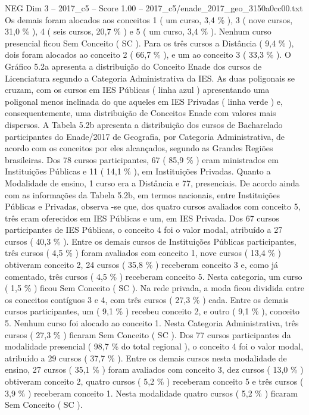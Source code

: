 \begin{textsample}{NEG Dim 3 – 2017\_c5 – Score 1.00 – 2017\_c5/enade\_2017\_geo\_3150a0cc00.txt}
Os demais foram alocados aos conceitos 1 ( um curso, 3,4 \% ), 3 ( nove cursos, 31,0 \% ), 4 ( seis cursos, 20,7 \% ) e 5 ( um curso, 3,4 \% ).
Nenhum curso presencial ficou Sem Conceito ( SC ).
Para os três cursos a Distância ( 9,4 \% ), dois foram alocados ao conceito 2 ( 66,7 \% ), e um ao conceito 3 ( 33,3 \% ).
O Gráfico 5.2a apresenta a distribuição do Conceito Enade dos cursos de Licenciatura segundo a Categoria Administrativa da IES.
As duas poligonais se cruzam, com os cursos em IES Públicas ( linha azul ) apresentando uma poligonal menos inclinada do que aqueles em IES Privadas ( linha verde ) e, consequentemente, uma distribuição de Conceitos Enade com valores mais dispersos.
A Tabela 5.2b apresenta a distribuição dos cursos de Bacharelado participantes do Enade/2017 de Geografia, por Categoria Administrativa, de acordo com os conceitos por eles alcançados, segundo as Grandes Regiões brasileiras.
Dos 78 cursos participantes, 67 ( 85,9 \% ) eram ministrados em Instituições Públicas e 11 ( 14,1 \% ), em Instituições Privadas.
Quanto a Modalidade de ensino, 1 curso era a Distância e 77, presenciais.
De acordo ainda com as informações da Tabela 5.2b, em termos nacionais, entre Instituições Públicas e Privadas, observa -se que, dos quatro cursos avaliados com conceito 5, três eram oferecidos em IES Públicas e um, em IES Privada.
Dos 67 cursos participantes de IES Públicas, o conceito 4 foi o valor modal, atribuído a 27 cursos ( 40,3 \% ).
Entre os demais cursos de Instituições Públicas participantes, três cursos ( 4,5 \% ) foram avaliados com conceito 1, nove cursos ( 13,4 \% ) obtiveram conceito 2, 24 cursos ( 35,8 \% ) receberam conceito 3 e, como já comentado, três cursos ( 4,5 \% ) receberam conceito 5.
Nesta categoria, um curso ( 1,5 \% ) ficou Sem Conceito ( SC ).
Na rede privada, a moda ficou dividida entre os conceitos contíguos 3 e 4, com três cursos ( 27,3 \% ) cada.
Entre os demais cursos participantes, um ( 9,1 \% ) recebeu conceito 2, e outro ( 9,1 \% ), conceito 5.
Nenhum curso foi alocado ao conceito 1.
Nesta Categoria Administrativa, três cursos ( 27,3 \% ) ficaram Sem Conceito ( SC ).
Dos 77 cursos participantes da modalidade presencial ( 98,7 \% do total regional ), o conceito 4 foi o valor modal, atribuído a 29 cursos ( 37,7 \% ).
Entre os demais cursos nesta modalidade de ensino, 27 cursos ( 35,1 \% ) foram avaliados com conceito 3, dez cursos ( 13,0 \% ) obtiveram conceito 2, quatro cursos ( 5,2 \% ) receberam conceito 5 e três cursos ( 3,9 \% ) receberam conceito 1.
Nesta modalidade quatro cursos ( 5,2 \% ) ficaram Sem Conceito ( SC ).

\end{textsample}

